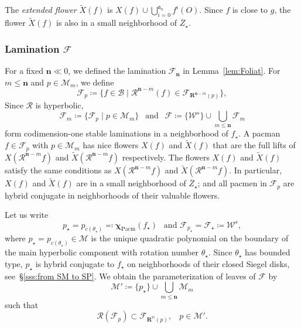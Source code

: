 \documentclass{amsart}
\renewcommand{\sp}{{\ \ }}
\newcommand{\1}{{\mathbb 1 }}
\newcommand{\Mandel}{{\mathcal{M}}}
\newcommand\MM{\mathscr{M}}
\newcommand\RR{\mathcal{R}}
\newcommand\mRR{\boldsymbol R}%
\newcommand{\bbn}{{\mathbf n}}
\newcommand{\str}{{\star}}
\newcommand{\mm}{\mathbb{m}}
\renewcommand{\aa}{\mathfrak{a}}
\newcommand\strai{{\boldsymbol \chi}}
\newcommand\WW{\mathcal{W}}
\newcommand\BB{\mathcal{B}}
\newcommand\Pacm{{\operatorname{Pacm}}}
\newcommand{\Fol}{{\mathcal F}}
\newcommand{\bFol}{{\boldsymbol{ \mathcal F}}}
\theoremstyle{remark}
\numberwithin{equation}{section}
\theoremstyle{definition}
\theoremstyle{nonumberbreak}
\begin{document}
The \emph{extended flower} $\widetilde X(f)$ is $X(f)\cup \bigcup_{i=0}^{\aa_n} f^i(O)$.  Since $f$ is close to $g$, the flower $\widetilde X(f)$ is also in a small neighborhood of $\overline Z_\str$. 
\subsubsection{Lamination $\bFol$} For a fixed $\bbn\ll0$, we defined the lamination $\bFol_\bbn$ in Lemma~\ref{lem:Foliat}. For $m\le \bbn$ and $p\in \Mandel_m$, we define
\[\Fol_{p}\coloneqq \{f\in \BB\mid \RR^{\bbn-m}(f)\in \Fol_{\mRR^{\bbn-m}(p)}\},\] 
Since $\RR$ is hyperbolic,
 \begin{equation}
\label{eq:ScThm:bfol} 
\bFol_m\coloneqq\{\Fol_{p}\mid p\in \Mandel_m\} \sp \text{ and } \sp \bFol\coloneqq  \{\WW^s\}\cup  \bigcup_{m\le \bbn}\bFol_{m}
\end{equation} form codimension-one stable laminations in a neighborhood of $f_\str$. A pacman $f\in \Fol_{p}$ with $p\in \MM_m$ has nice flowers $X(f)$ and $\widetilde X(f)$ that are the full lifts of $X(\RR^{\bbn-m} f)$ and $\widetilde X(\RR^{\bbn-m} f)$ respectively. The flowers $X(f)$  and $\widetilde X(f)$ satisfy the same conditions as $X(\RR^{\bbn-m} f)$ and $\widetilde X(\RR^{\bbn-m} f)$. In particular, $X(f)$ and $\widetilde X(f)$ are in a small neighborhood of $\overline Z_\str$; and all pacmen in $\Fol_{p}$ are hybrid conjugate in neighborhoods of their valuable flowers.  

Let us write \[p_{\str}=p_{c(\theta_\str)}\eqqcolon \strai_\Pacm (f_\str)\sp \text{  and }\Fol_{p_\str}=\Fol_{\str}\coloneqq \WW^s,\]
where $p_{\str}=p_{c(\theta_\str)}\in \Mandel$ is the unique quadratic polynomial on the boundary of the main hyperbolic component with rotation number $\theta_\str$. Since $\theta_\str$ has bounded type, $p_{\str}$  is hybrid conjugate to $f_\str$ on neighborhoods of their closed Siegel disks, see~\S\ref{sss:from SM to SP}.
We obtain the parameterization of leaves of $\bFol$ by \[\Mandel'\coloneqq \{p_\str\}\cup \bigcup_{m\le \bbn}\Mandel_m\] such that
\begin{equation}
\RR(\Fol_p) \subset \Fol_{\mRR^\mm(p)},\sp\sp p\in \Mandel'.
\end{equation}
\end{document}
